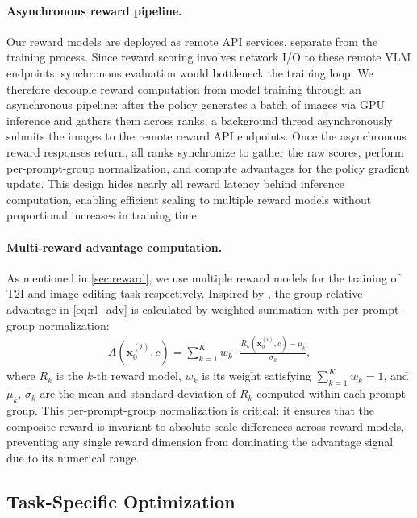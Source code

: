 \documentclass{llmxive}
\providecommand{\bm}[1]{\boldsymbol{#1}}
\providecommand{\mathbf}[1]{\bm{#1}}
\begin{document}
\paragraph{Asynchronous reward pipeline.} Our reward models are deployed as remote API services, separate from the training process. Since reward scoring involves network I/O to these remote VLM endpoints, synchronous evaluation would bottleneck the training loop. We therefore decouple reward computation from model training through an asynchronous pipeline: after the policy generates a batch of images via GPU inference and gathers them across ranks, a background thread asynchronously submits the images to the remote reward API endpoints. Once the asynchronous reward responses return, all ranks synchronize to gather the raw scores, perform per-prompt-group normalization, and compute advantages for the policy gradient update. This design hides nearly all reward latency behind inference computation, enabling efficient scaling to multiple reward models without proportional increases in training time.

\paragraph{Multi-reward advantage computation.} As mentioned in \cref{sec:reward}, we use multiple reward models for the training of T2I and image editing task respectively. Inspired by \citet{liu2026gdpo}, the group-relative advantage in \cref{eq:rl_adv} is calculated by weighted summation with per-prompt-group normalization:
\begin{align}
    A(\mathbf{x}_0^{(i)}, c) = \sum_{k=1}^{K} w_k \cdot \frac{R_k(\mathbf{x}_0^{(i)}, c) - \mu_k}{\sigma_k},
    \label{eq:reward_composition}
\end{align}
where $R_k$ is the $k$-th reward model, $w_k$ is its weight satisfying $\sum_{k=1}^K w_k=1$, and $\mu_k$, $\sigma_k$ are the mean and standard deviation of $R_k$ computed within each prompt group. This per-prompt-group normalization is critical: it ensures that the composite reward is invariant to absolute scale differences across reward models, preventing any single reward dimension from dominating the advantage signal due to its numerical range. 

\subsection{Task-Specific Optimization}
\label{sec:task_opt}
\end{document}
